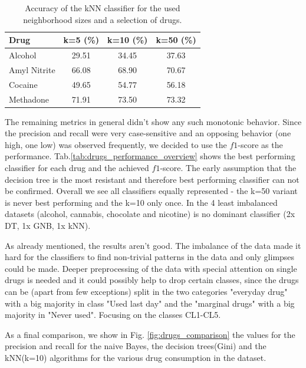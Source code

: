 \documentclass{article}
\begin{document}
\begin{table}[h!]
		\centering
    \begin{tabular}{ l c c c }
        \toprule
        \textbf{Drug} & \textbf{k=5 (\%)} & \textbf{k=10 (\%)} & \textbf{k=50 (\%)} \\
        \toprule
        Alcohol & 29.51 & 34.45 & 37.63 \\
        Amyl Nitrite & 66.08 & 68.90 & 70.67 \\
        Cocaine & 49.65 & 54.77 & 56.18 \\
        Methadone & 71.91 & 73.50 & 73.32 \\
        \bottomrule
    \end{tabular}
		\caption{Accuracy of the kNN classifier for the used neighborhood sizes and a selection of drugs.}
		\label{tab:accuracy_kNN_selection}
\end{table}

The remaining metrics in general didn't show any such monotonic behavior. Since the precision and recall were very case-sensitive and an opposing behavior (one high, one low) was observed frequently, we decided to use the $f1$-score as the performance. Tab.\ref{tab:drugs_performance_overview} shows the best performing classifier for each drug and the achieved $f1$-score.
The early assumption that the decision tree is the most resistant and therefore best performing classifier can not be confirmed. Overall we see all classifiers equally represented - the k=50 variant is never best performing and the k=10 only once. In the 4 least imbalanced datasets (alcohol, cannabis, chocolate and nicotine) is no dominant classifier (2x DT, 1x GNB, 1x kNN).

As already mentioned, the results aren't good. The imbalance of the data made it hard for the classifiers to find non-trivial patterns in the data and only glimpses could be made. Deeper preprocessing of the data with special attention on single drugs is needed and it could possibly help to drop certain classes, since the drugs can be (apart from few exceptions) split in the two categories "everyday drug" with a big majority in class "Used last day" and the "marginal drugs" with a big majority in "Never used". Focusing on the classes CL1-CL5.


As a final comparison, we show in Fig. \ref{fig:drugs_comparison} the values for the precision and recall for the naive Bayes, the decision trees(Gini) and the kNN(k=10) algorithms for the various drug consumption in the dataset. 
\end{document}
